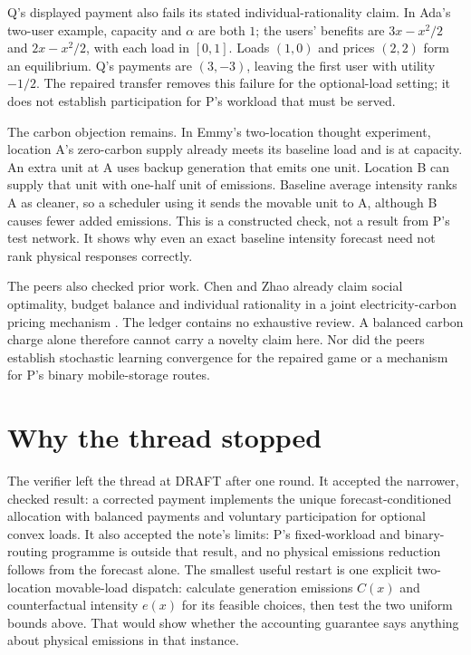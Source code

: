 \documentclass{article}
\begin{document}
Q's displayed payment also fails its stated individual-rationality claim. In Ada's two-user example,
capacity and \(\alpha\) are both \(1\); the users' benefits are \(3x-x^2/2\) and \(2x-x^2/2\), with each
load in \([0,1]\). Loads \((1,0)\) and prices \((2,2)\) form an equilibrium. Q's payments are \((3,-3)\),
leaving the first user with utility \(-1/2\). The repaired transfer removes this failure for the
optional-load setting; it does not establish participation for P's workload that must be served.

The carbon objection remains. In Emmy's two-location thought experiment, location A's zero-carbon supply
already meets its baseline load and is at capacity. An extra unit at A uses backup generation that emits
one unit. Location B can supply that unit with one-half unit of emissions. Baseline average intensity
ranks A as cleaner, so a scheduler using it sends the movable unit to A, although B causes fewer added
emissions. This is a constructed check, not a result from P's test network. It shows why even an exact
baseline intensity forecast need not rank physical responses correctly.

The peers also checked prior work. Chen and Zhao already claim social optimality, budget balance and
individual rationality in a joint electricity-carbon pricing mechanism \cite{ChenZhao}. The ledger
contains no exhaustive review. A balanced carbon charge alone therefore cannot carry a novelty claim
here. Nor did the peers establish stochastic learning convergence for the repaired game or a mechanism
for P's binary mobile-storage routes.

\section{Why the thread stopped}

The verifier left the thread at DRAFT after one round. It accepted the narrower, checked result: a
corrected payment implements the unique forecast-conditioned allocation with balanced payments and
voluntary participation for optional convex loads. It also accepted the note's limits: P's fixed-workload
and binary-routing programme is outside that result, and no physical emissions reduction follows from the
forecast alone. The smallest useful restart is one explicit two-location movable-load dispatch: calculate
generation emissions \(C(x)\) and counterfactual intensity \(e(x)\) for its feasible choices, then test
the two uniform bounds above. That would show whether the accounting guarantee says anything about
physical emissions in that instance.



\end{document}
